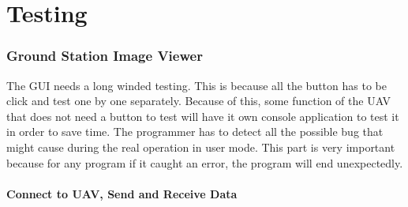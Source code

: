 \chapter{Testing}



\subsection{Ground Station Image Viewer}
The GUI needs a long winded testing. This is because all the button has to be click and test one by one separately. Because of this, some function of the UAV that does not need a button to test will have it own console application to test it in order to save time. The programmer has to detect all the possible bug that might cause during the real operation in user mode. This part is very important because for any program if it caught an error, the program will end unexpectedly.
\subsubsection{Connect to UAV, Send and Receive Data}

